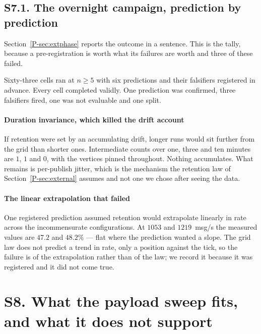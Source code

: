 \documentclass[10pt,journal,onecolumn]{IEEEtran}
\newcommand{\mainModeB}{\ref{P-sec:external}}              %
\newcommand{\mainPhase}{\ref{P-sec:extphase}}            %
\begin{document}
\subsection{S7.1. The overnight campaign, prediction by prediction}
\label{sec:overnight}

Section~\mainPhase{} reports the outcome in a sentence. This is the tally, because a
pre-registration is worth what its failures are worth and three of these failed.

Sixty-three cells ran at $n \ge 5$ with six predictions and their falsifiers registered in
advance. Every cell completed validly. One prediction was confirmed, three falsifiers fired,
one was not evaluable and one split.

\paragraph{Duration invariance, which killed the drift account}
If retention were set by an accumulating drift, longer runs would sit further from the grid
than shorter ones. Intermediate counts over one, three and ten minutes are $1$, $1$ and $0$,
with the vertices pinned throughout. Nothing accumulates. What remains is per-publish jitter,
which is the mechanism the retention law of Section~\mainModeB{} assumes and not one we
chose after seeing the data.

\paragraph{The linear extrapolation that failed}
One registered prediction assumed retention would extrapolate linearly in rate across the
incommensurate configurations. At $1053$ and $1219$~msg/s the measured values are $47.2$ and $48.2\%$
--- flat where the prediction wanted a slope. The grid law does not predict a trend in rate,
only a position against the tick, so the failure is of the extrapolation rather than of the
law; we record it because it was registered and it did not come true.

\section{S8. What the payload sweep fits, and what it does not support}
\end{document}
